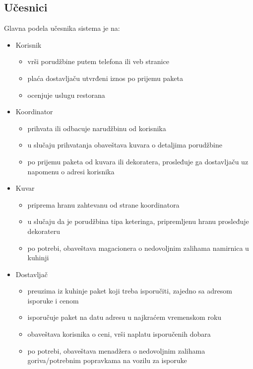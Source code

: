 

\subsection{Učesnici}
Glavna podela učesnika sistema je na:

\begin{itemize}
    \item Korisnik
    \begin{itemize}
        \item vrši porudžbine putem telefona ili veb stranice
        \item plaća dostavljaču utvrđeni iznos po prijemu paketa
        \item ocenjuje uslugu restorana
    \end{itemize}
    \item Koordinator
    \begin{itemize}
        \item prihvata ili odbacuje narudžbinu od korisnika
        \item u slučaju prihvatanja obaveštava kuvara o detaljima porudžbine
        \item po prijemu paketa od kuvara ili dekoratera, prosleđuje ga dostavljaču uz napomenu o adresi korisnika
    \end{itemize}
    \item Kuvar
    \begin{itemize}
        \item priprema hranu zahtevanu od strane koordinatora
        \item u slučaju da je porudžbina tipa keteringa, pripremljenu hranu prosleđuje dekorateru
        \item po potrebi, obaveštava magacionera o nedovoljnim zalihama namirnica u kuhinji
    \end{itemize}
    \item Dostavljač
    \begin{itemize}
        \item preuzima iz kuhinje paket koji treba isporučiti, zajedno sa adresom isporuke i cenom
        \item isporučuje paket na datu adresu u najkraćem vremenskom roku
        \item obaveštava korisnika o ceni, vrši naplatu isporučenih dobara
        \item po potrebi, obaveštava menadžera o nedovoljnim zalihama goriva/potrebnim popravkama na vozilu za isporuke

\end{itemize}
\end{itemize}
